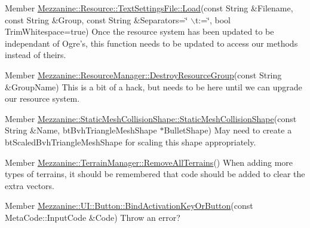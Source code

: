 \label{todo__todo000029}
\hypertarget{todo__todo000029}{}
 
\begin{DoxyDescription}
\item[Member \hyperlink{classMezzanine_1_1Resource_1_1TextSettingsFile_a5ffb86d6822701880e1dc47b4f37a637}{Mezzanine::Resource::TextSettingsFile::Load}(const String \&Filename, const String \&Group, const String \&Separators=\char`\"{} $\backslash$t:=\char`\"{}, bool TrimWhitespace=true) ]Once the resource system has been updated to be independant of Ogre's, this function needs to be updated to access our methods instead of theirs. 
\end{DoxyDescription}

\label{todo__todo000028}
\hypertarget{todo__todo000028}{}
 
\begin{DoxyDescription}
\item[Member \hyperlink{classMezzanine_1_1ResourceManager_aa827efdad18698b7d7319dab35864bbe}{Mezzanine::ResourceManager::DestroyResourceGroup}(const String \&GroupName) ]This is a bit of a hack, but needs to be here until we can upgrade our resource system. 
\end{DoxyDescription}

\label{todo__todo000006}
\hypertarget{todo__todo000006}{}
 
\begin{DoxyDescription}
\item[Member \hyperlink{classMezzanine_1_1StaticMeshCollisionShape_a1c565cc4d62ab7a0cd5cf55254905f05}{Mezzanine::StaticMeshCollisionShape::StaticMeshCollisionShape}(const String \&Name, btBvhTriangleMeshShape $\ast$BulletShape) ]May need to create a btScaledBvhTriangleMeshShape for scaling this shape appropriately. 
\end{DoxyDescription}

\label{todo__todo000030}
\hypertarget{todo__todo000030}{}
 
\begin{DoxyDescription}
\item[Member \hyperlink{classMezzanine_1_1TerrainManager_ae940f33a369e54c2322de4202d236eb2}{Mezzanine::TerrainManager::RemoveAllTerrains}() ]When adding more types of terrains, it should be remembered that code should be added to clear the extra vectors. 
\end{DoxyDescription}

\label{todo__todo000031}
\hypertarget{todo__todo000031}{}
 
\begin{DoxyDescription}
\item[Member \hyperlink{classMezzanine_1_1UI_1_1Button_aae0a7f6a07f79856ed6da8b8b3bc5ecd}{Mezzanine::UI::Button::BindActivationKeyOrButton}(const MetaCode::InputCode \&Code) ]Throw an error? 
\end{DoxyDescription}

